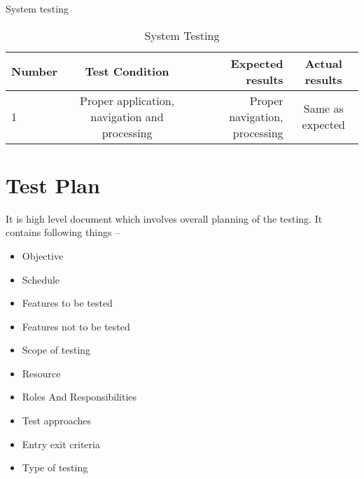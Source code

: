 System testing 

\begin{table}[h]
\centering
\begin{tabular}{|l|c|r|c|}
\hline 
Number & Test Condition & Expected results & Actual results\\
\hline
1 & Proper application, navigation and processing & Proper navigation, processing & Same as expected\\
\hline
\end{tabular} 
\caption{System Testing}
\end{table}

	
\section{Test Plan}
               It is high level document which involves overall planning of the testing.
It contains following things –
\begin{itemize}
\item Objective
\item Schedule
\item Features to be tested
\item Features not to be tested
\item Scope of testing
\item Resource
\item Roles And Responsibilities
\item Test approaches
\item Entry exit criteria
\item Type of testing
\end{itemize}